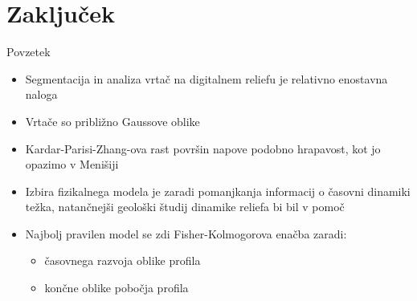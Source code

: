 \documentclass{beamer}
\begin{document}
\section*{Zaključek}

\begin{frame}{Povzetek}
  \begin{itemize}
  \item<1->
    Segmentacija in analiza vrtač na digitalnem reliefu je relativno enostavna naloga
  \item<2->
    Vrtače so približno Gaussove oblike
  \item<3->
    Kardar-Parisi-Zhang-ova rast površin napove podobno hrapavost, kot jo opazimo v Menišiji
  \item<4->
    Izbira fizikalnega modela je zaradi pomanjkanja informacij o časovni dinamiki težka, natančnejši geološki študij dinamike reliefa bi bil v pomoč
  \item<5->
    Najbolj pravilen model se zdi Fisher-Kolmogorova enačba zaradi:
    \begin{itemize}
      \item<6->
        časovnega razvoja oblike profila
      \item<7->
        končne oblike pobočja profila
    \end{itemize}
  \end{itemize}
\end{frame}

\end{document}
